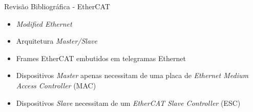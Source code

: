 \begin{frame}{Revis\~{a}o Bibliogr\'{a}fica - EtherCAT}
	\large
	\begin{itemize}[<.->]
		\item \emph{Modified Ethernet}
		\item Arquitetura \emph{Master/Slave}
		\item Frames EtherCAT embutidos em telegramas Ethernet
		\item Dispositivos \emph{Master} apenas necessitam de uma placa de \emph{Ethernet Medium Access Controller} (MAC)
		\item Dispositivos \emph{Slave} necessitam de um \emph{EtherCAT Slave Controller} (ESC)
	\end{itemize}
\end{frame}